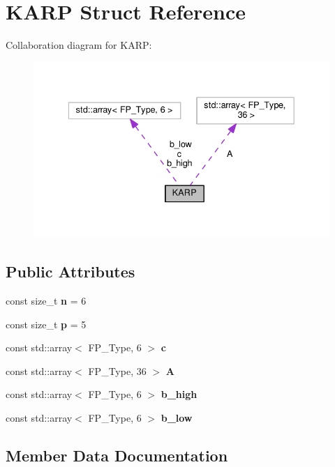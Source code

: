 \hypertarget{structKARP}{}\section{K\+A\+RP Struct Reference}
\label{structKARP}


Collaboration diagram for K\+A\+RP\+:\nopagebreak
\begin{figure}[H]
\begin{center}
\leavevmode
\includegraphics[width=336pt]{structKARP__coll__graph}
\end{center}
\end{figure}
\subsection*{Public Attributes}
\begin{DoxyCompactItemize}
\item 
\mbox{\label{structKARP_ae4748bfe9d63b1aaa28a8ea47072f8e3}} 
const size\+\_\+t {\bfseries n} = 6
\item 
\mbox{\label{structKARP_a68a9bee99c22bab5ba56a392e2fa6cb0}} 
const size\+\_\+t {\bfseries p} = 5
\item 
const std\+::array$<$ F\+P\+\_\+\+Type, 6 $>$ {\bfseries c}
\item 
const std\+::array$<$ F\+P\+\_\+\+Type, 36 $>$ {\bfseries A}
\item 
const std\+::array$<$ F\+P\+\_\+\+Type, 6 $>$ {\bfseries b\+\_\+high}
\item 
const std\+::array$<$ F\+P\+\_\+\+Type, 6 $>$ {\bfseries b\+\_\+low}
\end{DoxyCompactItemize}


\subsection{Member Data Documentation}
\mbox{\label{structKARP_a5e62cee865e772c7a7e7072f578c658d}} 
